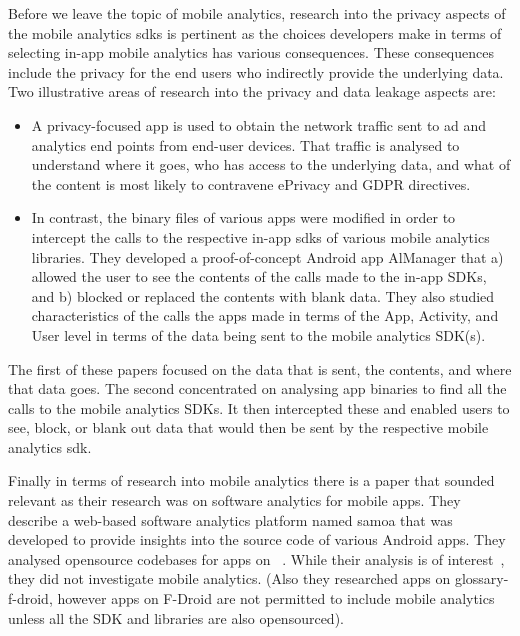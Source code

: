 Before we leave the topic of mobile analytics, research into the privacy aspects of the mobile analytics \Glspl{sdk} is pertinent as the choices developers make in terms of selecting in-app mobile analytics has various consequences. These consequences include the privacy for the end users who indirectly provide the underlying data. Two illustrative areas of research into the privacy and data leakage aspects are:

\begin{itemize}
        \item A privacy-focused app is used to obtain the network traffic sent to ad and analytics end points from end-user devices. That traffic is analysed to understand where it goes, who has access to the underlying data, and what of the content is most likely to contravene ePrivacy and GDPR directives.
        \item In contrast, the binary files of various apps were modified in order to intercept the calls to the respective in-app \Glspl{sdk} of various mobile analytics libraries. They developed a proof-of-concept Android app AlManager that a) allowed the user to see the contents of the calls made to the in-app SDKs, and b) blocked or replaced the contents with blank data. They also studied characteristics of the calls the apps made in terms of the App, Activity, and User level in terms of the data being sent to the mobile analytics SDK(s).
\end{itemize}

The first of these papers focused on the data that is sent, the contents, and where that data goes. The second concentrated on analysing app binaries to find all the calls to the mobile analytics SDKs. It then intercepted these and enabled users to see, block, or blank out data that would then be sent by the respective mobile analytics \Gls{sdk}.

Finally in terms of research into mobile analytics there is a paper that sounded relevant as their research was on software analytics for mobile apps. They describe a web-based software analytics platform named \Gls{samoa} that was developed to provide insights into the source code of various Android apps. They analysed opensource codebases for apps on ~. While their analysis is of interest~, they did not investigate mobile analytics. (Also they researched apps on \Gls{glossary-f-droid}, however apps on F-Droid are not permitted to include mobile analytics unless all the SDK and libraries are also opensourced).

